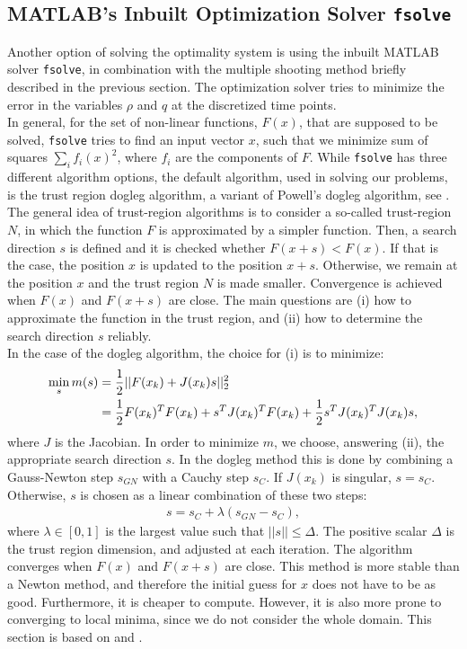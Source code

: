 \documentclass[11pt, a4paper]{article}
\theoremstyle{definition}
\newcommand{\adj}{q}
\begin{document}
\subsection{{\scshape MATLAB}'s Inbuilt Optimization Solver \texttt{fsolve}} \label{sec:fsolvedescription}
Another option of solving the optimality system is using the inbuilt {\scshape MATLAB} solver \texttt{fsolve}, in combination with the multiple shooting method briefly described in the previous section. The optimization solver tries to minimize the error in the variables $\rho$ and $\adj$ at the discretized time points. 
\\
In general, for the set of non-linear functions, $F(x)$, that are supposed to be solved, \texttt{fsolve} tries to find an input vector $x$, such that we minimize sum of squares $\sum_i f_i(x)^2$, where $f_i$ are the components of $F$. 
While \texttt{fsolve} has three different algorithm options, the default algorithm, used in solving our problems, is the trust region dogleg algorithm, a variant of Powell's dogleg algorithm, see \cite{Powell1}.   
The general idea of trust-region algorithms is to consider a so-called trust-region $N$, in which the function $F$ is approximated by a simpler function. Then, a search direction $s$ is defined and it is checked whether $F(x+s) < F(x)$. If that is the case, the position $x$ is updated to the position $x+s$. Otherwise, we remain at the position $x$ and the trust region $N$ is made smaller. Convergence is achieved when $F(x)$ and $F(x+s)$ are close.
The main questions are (i) how to approximate the function in the trust region, and (ii) how to determine the search direction $s$ reliably.\\
In the case of the dogleg algorithm, the choice for (i) is to minimize:
\begin{align}
\label{eqn:trustregionsubprob1}
\min_s m(s) &= \frac{1}{2}|| F(x_k) + J(x_k)s||_2^2 \\
&= \frac{1}{2}F(x_k)^T F(x_k) + s^T J(x_k)^T F(x_k) + \frac{1}{2}s^T J(x_k)^TJ(x_k)s, \notag
\end{align}
where $J$ is the Jacobian.
In order to minimize $m$, we choose, answering (ii), the appropriate search direction $s$. In the dogleg method this is done by combining a Gauss-Newton step $s_{GN}$ with a Cauchy step $s_C$.
If $J(x_k)$ is singular, $s = s_C$. Otherwise, $s$ is chosen as a linear combination of these two steps:
\begin{align*}
s = s_C + \lambda(s_{GN} - s_C),
\end{align*}
where $\lambda \in [0,1]$ is the largest value such that $||s|| \leq \Delta$. The positive scalar $\Delta$ is the trust region dimension, and adjusted at each iteration. The algorithm converges when $F(x)$ and $F(x+s)$ are close. 
This method is more stable than a Newton method, and therefore the initial guess for $x$ does not have to be as good. Furthermore, it is cheaper to compute. However, it is also more prone to converging to local minima, since we do not consider the whole domain.
This section is based on \cite{fsolve1} and \cite{Powell1}.
\end{document}
